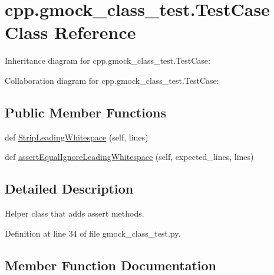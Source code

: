 \hypertarget{classcpp_1_1gmock__class__test_1_1_test_case}{}\section{cpp.\+gmock\+\_\+class\+\_\+test.\+Test\+Case Class Reference}
\label{classcpp_1_1gmock__class__test_1_1_test_case}


Inheritance diagram for cpp.\+gmock\+\_\+class\+\_\+test.\+Test\+Case\+:


Collaboration diagram for cpp.\+gmock\+\_\+class\+\_\+test.\+Test\+Case\+:
\subsection*{Public Member Functions}
\begin{DoxyCompactItemize}
\item 
def \hyperlink{classcpp_1_1gmock__class__test_1_1_test_case_a366b15717eebc41e397357868c5734c5}{Strip\+Leading\+Whitespace} (self, lines)
\item 
def \hyperlink{classcpp_1_1gmock__class__test_1_1_test_case_a68f88bba11511f8c582123d47bf80464}{assert\+Equal\+Ignore\+Leading\+Whitespace} (self, expected\+\_\+lines, lines)
\end{DoxyCompactItemize}


\subsection{Detailed Description}
\begin{DoxyVerb}Helper class that adds assert methods.\end{DoxyVerb}
 

Definition at line 34 of file gmock\+\_\+class\+\_\+test.\+py.



\subsection{Member Function Documentation}

